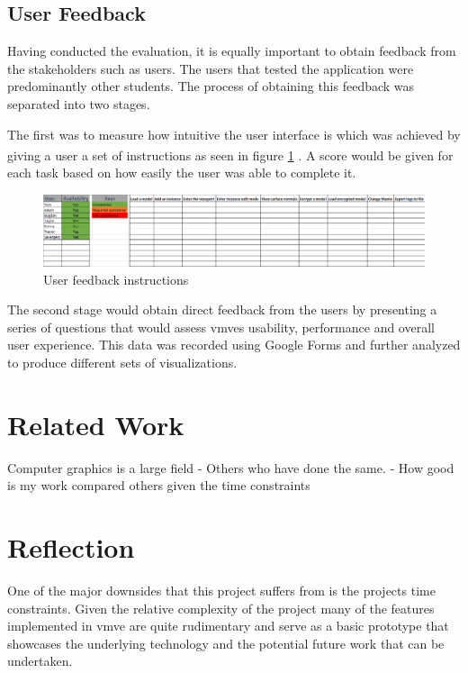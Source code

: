 \documentclass[11pt]{article}
\begin{document}
\subsection{User Feedback}
Having conducted the evaluation, it is equally important to obtain feedback from
the stakeholders such as users. The users that tested the application were
predominantly other students. The process of obtaining this feedback was
separated into two stages.

The first was to measure how intuitive the user interface is which was achieved
by giving a user a set of instructions as seen in figure \ref{fig:instructions}
\textsuperscript{}.
A score would be given for each task based on how easily the user was able to
complete it.

\begin{figure}[H]
  \centering
  \includegraphics[width=\textwidth]{images/user_instructions.png}
  \caption{User feedback instructions }
  \label{fig:instructions}
\end{figure}

The second stage would obtain direct feedback from the users by presenting a
series of questions that would assess \glspl*{vmve} usability, performance and
overall user experience. This data was recorded using Google Forms and further
analyzed to produce different sets of visualizations.

\clearpage
\section{Related Work}
Computer graphics is a large field 
- Others who have done the same.
- How good is my work compared others given the time constraints

\clearpage
\section{Reflection}

One of the major downsides that this project suffers from is the projects time
constraints. Given the relative complexity of the project many of the features
implemented in \gls*{vmve} are quite rudimentary and serve as a basic prototype that
showcases the underlying technology and the potential future work that can be
undertaken.
\end{document}
